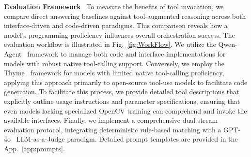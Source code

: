 \documentclass[runningheads]{llncs}
\begin{document}
\noindent \textbf{Evaluation Framework}~
To measure the benefits of tool invocation, we compare direct answering baselines against tool-augmented reasoning across both interface-driven and code-driven paradigms.
This comparison reveals how a model's programming proficiency influences overall orchestration success. 
The evaluation workflow is illustrated in Fig.~\ref{fig:WorkFlow}.
We utilize the Qwen-Agent~\cite{qwen_agent} framework to manage both code and interface implementations for models with robust native tool-calling support. 
Conversely, we employ the Thyme~\cite{zhang2025thyme} framework for models with limited native tool-calling proficiency, applying this approach primarily to open-source tool-use models to facilitate code generation. 
To facilitate this process, we provide detailed tool descriptions that explicitly outline usage instructions and parameter specifications, ensuring that even models lacking specialized OpenCV training can comprehend and invoke the available interfaces. 
Finally, we implement a comprehensive dual-stream evaluation protocol, integrating deterministic rule-based matching with a GPT-4o~\cite{hurst2024gpt4o} LLM-as-a-Judge paradigm. 
Detailed prompt templates are provided in the App.~\ref{app:prompts}.
\end{document}
